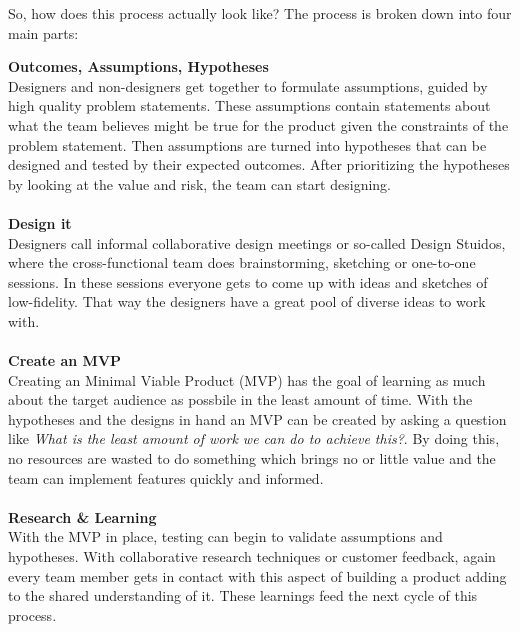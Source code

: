 So, how does this process actually look like? The process is broken down into four main parts:


\textbf{Outcomes, Assumptions, Hypotheses} \\ %
Designers and non-designers get together to formulate assumptions, guided by high quality problem
statements. These assumptions contain statements about what the team believes might be true for the
product given the constraints of the problem statement. Then assumptions are turned into hypotheses
that can be designed and tested by their expected outcomes. After prioritizing the hypotheses by
looking at the value and risk, the team can start designing.
\\\\
\textbf{Design it} \\
Designers call informal collaborative design meetings or so-called Design Stuidos, where the
cross-functional team does brainstorming, sketching or one-to-one sessions. In these sessions
everyone gets to come up with ideas and sketches of low-fidelity. That way the designers have a
great pool of diverse ideas to work with.  \\\\ 
\textbf{Create an MVP} \\
Creating an Minimal Viable Product (MVP) has the goal of learning as much about the target audience
as possbile in the least amount of time. With the hypotheses and the designs in hand an MVP can be
created by asking a question like \textit{What is the least amount of work we can do to achieve
this?}. By doing this, no resources are wasted to do something which brings no or little value and
the team can implement features quickly and informed.
 \\\\
\textbf{Research \& Learning} \\
With the MVP in place, testing can begin to validate assumptions and hypotheses. With collaborative
research techniques or customer feedback, again every team member gets in contact with this aspect
of building a product adding to the shared understanding of it. These learnings feed the next cycle
of this process.  \\

